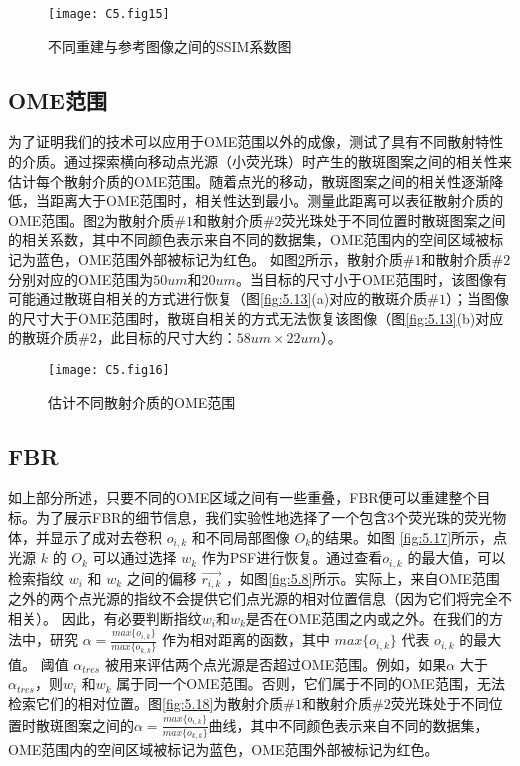 \begin{figure}[htp]
	\centering
	\texttt{[image: C5.fig15]}
	\caption{不同重建与参考图像之间的SSIM系数图}
	\label{fig:5.15}
\end{figure}

\subsection{OME范围}

为了证明我们的技术可以应用于OME范围以外的成像，测试了具有不同散射特性的介质。通过探索横向移动点光源（小荧光珠）时产生的散斑图案之间的相关性来估计每个散射介质的OME范围。随着点光的移动，散斑图案之间的相关性逐渐降低，当距离大于OME范围时，相关性达到最小。测量此距离可以表征散射介质的OME范围。图\ref{fig:5.16}为散射介质$\# 1$和散射介质$\# 2$荧光珠处于不同位置时散斑图案之间的相关系数，其中不同颜色表示来自不同的数据集，OME范围内的空间区域被标记为蓝色，OME范围外部被标记为红色。
如图\ref{fig:5.16}所示，散射介质$\# 1$和散射介质$\# 2$分别对应的OME范围为$50 um$和$20 um$。当目标的尺寸小于OME范围时，该图像有可能通过散斑自相关的方式进行恢复（图\ref{fig:5.13}(a)对应的散斑介质$\# 1$）；当图像的尺寸大于OME范围时，散斑自相关的方式无法恢复该图像（图\ref{fig:5.13}(b)对应的散斑介质$\# 2$，此目标的尺寸大约：$ 58 um \times 22 um $）。

\begin{figure}[htp]
	\centering
	\texttt{[image: C5.fig16]}
	\caption{估计不同散射介质的OME范围}
	\label{fig:5.16}
\end{figure}

\subsection{FBR}

如上部分所述，只要不同的OME区域之间有一些重叠，FBR便可以重建整个目标。为了展示FBR的细节信息，我们实验性地选择了一个包含3个荧光珠的荧光物体，并显示了成对去卷积 $o_{i,k}$ 和不同局部图像 $O_{k}$的结果。如图 \ref{fig:5.17}所示，点光源 $k$ 的 $O_{k}$ 可以通过选择 $w_{k}$ 作为PSF进行恢复。通过查看$o_{i,k}$ 的最大值，可以检索指纹 $w_{i}$ 和 $w_{k}$ 之间的偏移 $\vec{r_{i,k}}$ ，如图\ref{fig:5.8}所示。实际上，来自OME范围之外的两个点光源的指纹不会提供它们点光源的相对位置信息（因为它们将完全不相关）。
因此，有必要判断指纹$w_{i}$和$w_{k}$是否在OME范围之内或之外。在我们的方法中，研究 $\alpha= \frac {max\{o_{i,k}\}} {max\{o_{k,k}\}}$ 作为相对距离的函数，其中 $max \{ o_{i,k} \}$ 代表 $o_{i,k}$ 的最大值。
阈值 $\alpha_{tres}$ 被用来评估两个点光源是否超过OME范围。例如，如果$\alpha$ 大于$\alpha_{tres}$，则$w_{i}$ 和$w_{k}$ 属于同一个OME范围。否则，它们属于不同的OME范围，无法检索它们的相对位置。图\ref{fig:5.18}为散射介质$\# 1$和散射介质$\# 2$荧光珠处于不同位置时散斑图案之间的$\alpha= \frac {max\{o_{i,k}\}} {max\{o_{k,k}\}}$曲线，其中不同颜色表示来自不同的数据集，OME范围内的空间区域被标记为蓝色，OME范围外部被标记为红色。

